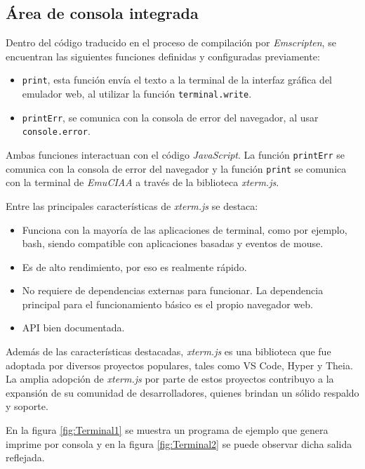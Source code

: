 \subsection{Área de consola integrada}

Dentro del código traducido en el proceso de compilación por \textit{Emscripten}, se encuentran las siguientes funciones definidas y configuradas previamente: 

\begin{itemize}
\item \texttt{print}, esta función envía el texto a la terminal de la interfaz gráfica del emulador web, al utilizar la función \texttt{terminal.write}.
\item \texttt{printErr}, se comunica con la consola de error del navegador, al usar \newline \texttt{console.error}.
\end{itemize}

Ambas funciones interactuan con el código \textit{JavaScript}. La función \texttt{printErr} se comunica con la consola de error del navegador y la función \texttt{print} se comunica con la terminal de \textit{EmuCIAA} a través de la biblioteca \textit{xterm.js}.

Entre las principales características de \textit{xterm.js} se destaca:

\begin{itemize}
    \item Funciona con la mayoría de las aplicaciones de terminal, como por ejemplo, bash, siendo compatible con aplicaciones basadas y eventos de mouse.
    \item Es de alto rendimiento, por eso es realmente rápido.
    \item No requiere de dependencias externas para funcionar. La dependencia principal para el funcionamiento básico es el propio navegador web.
    \item API bien documentada.
\end{itemize}

Además de las características destacadas, \textit{xterm.js} es una biblioteca que fue adoptada por diversos proyectos populares, tales como VS Code, Hyper y Theia. La amplia adopción de \textit{xterm.js} por parte de estos proyectos contribuyo a la expansión de su comunidad de desarrolladores, quienes brindan un sólido respaldo y soporte.

En la figura \ref{fig:Terminal1} se muestra un programa de ejemplo que genera imprime por consola y en la figura \ref{fig:Terminal2} se puede observar dicha salida reflejada.

